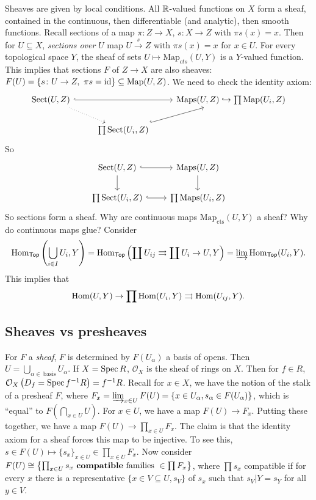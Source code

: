     Sheaves are given by local conditions. All $\mathbb{R}$-valued functions on $X$ form a sheaf, contained in the continuous, then differentiable (and analytic), then smooth functions. Recall sections of a map $\pi \colon Z \to X$, $s \colon X \to Z$ with $\pi s(x)=x$. Then for $U \subseteq X$, \emph{sections over} $U$ map $U\xrightarrow{s} Z$ with $\pi s(x)=x$ for $x \in U$. For every topological space $Y$, the sheaf of sets $U \mapsto  \mathrm{Map}_{cts}(U,Y)$ is a $Y$-valued function. This implies that sections $F $ of $Z \to X$ are also sheaves: $F(U)= \{s \colon U \to Z, \ \pi s = \id\} \subseteq \mathrm{Map}(U,Z)$. We need to check the identity axiom: \[
        \begin{tikzcd}
{\mathrm{Sect}(U,Z) } \arrow[rr, hook] \arrow[rd, dotted] &                                                & {\mathrm{Maps}(U,Z) \hookrightarrow \prod \mathrm{Map}(U_i ,Z)} \\
                                                          & {\prod \mathrm{Sect}(U_i ,Z)} \arrow[ru, hook] &                                                                
\end{tikzcd}
    \] So \[
    \begin{tikzcd}
{\mathrm{Sect}(U,Z)} \arrow[d] \arrow[r, hook] & {\mathrm{Maps}(U,Z)} \arrow[d] \\
{\prod \mathrm{Sect}(U_i,Z)} \arrow[r, hook]   & {\prod \mathrm{Maps}(U_i,Z)}  
\end{tikzcd}
    \] So sections form a sheaf. Why are continuous maps $\mathrm{Map}_{\mathrm{cts}}(U,Y)$ a sheaf? Why do continuous maps glue? Consider 
    \[
    \operatorname{Hom} _{\mathsf{Top} }\left( \bigcup_{i \in I} U_i , Y\right)=\operatorname{Hom} _{\mathsf{Top} }\left( \coprod U_{ij} \rightrightarrows \coprod U_i \to  U, Y\right) = \varinjlim\operatorname{Hom} _{\mathsf{Top} }(U_i ,Y).
    \] This implies that \[
    \operatorname{Hom}(U,Y) \to \prod \operatorname{Hom}(U_i ,Y) \rightrightarrows \operatorname{Hom}(U _{ij},Y).
    \] 
    \subsection{Sheaves vs presheaves}
    
    For $F$ a \emph{sheaf}, $F$ is determined by $F(U _{\alpha })$ a basis of opens. Then $U = \bigcup_{\alpha  \in \ \text{basis} } U_{\alpha }$. If $X=\operatorname{Spec} R$, $\mathcal{O} _X$ is the sheaf of rings on $X$. Then for $f \in R$, $\mathcal{O} _X\left( D_f=\operatorname{Spec} f ^{-1} R \right) =f ^{-1} R$. Recall for $x \in X$, we have the notion of the stalk of a presheaf $F$, where $F_x=\varinjlim _{x \in U}F(U)= \{ x \in U _{\alpha }, s_{\alpha }\in F(U _{\alpha })\} $, which is ``equal'' to $F\left(  \bigcap_{x \in U} U \right) .$ For $x \in U$, we have a map $F(U) \to  F_x$. Putting these together, we have a map $F(U) \to  \prod _{x \in U}F_x$. The claim is that the identity axiom for a sheaf forces this map to be injective. To see this, $s \in F(U) \mapsto \{s_x\} _{x \in U}\in \prod _{x \in U}F_x$. Now consider $F(U)\cong \left\{ \prod _{x \in U}s_x \ \text{{\bf compatible} families}\ \in \prod F_x\right\} $, where $\prod s_x$ compatible if for every $x$ there is a representative $\{x \in V \subseteq U, s_V\} $ of $s_x$ such that $\left. s_V \right| Y=s_Y$ for all $y \in V$.

